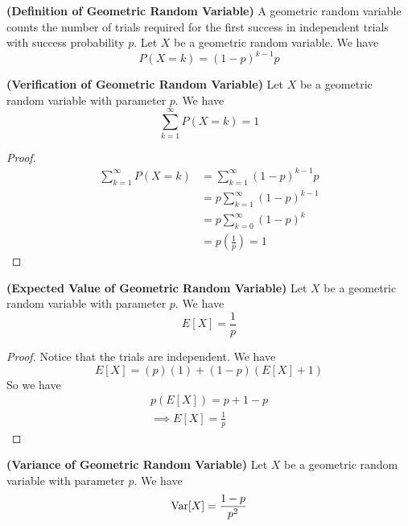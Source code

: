 \documentclass{report}
\begin{document}
\begin{definition}
\textbf{(Definition of Geometric Random Variable)} A geometric random variable counts the number of trials required for the first success in independent trials with success probability $p$. Let  $X$ be a geometric random variable. We have
\begin{equation}
P(X=k)=(1-p)^{k-1}p
\end{equation}
\end{definition}
\begin{theorem}
\textbf{(Verification of Geometric Random Variable)} Let $X$ be a geometric random variable with parameter $p$. We have
\begin{equation}
\sum_{k=1}^\infty P(X=k)=1
\end{equation}
\end{theorem}
\begin{proof}
\begin{align}
\sum_{k=1}^\infty P(X=k)&=\sum_{k=1}^\infty (1-p)^{k-1}p\\
&=p\sum_{k=1}^\infty (1-p)^{k-1}\\
&=p\sum_{k=0}^\infty (1-p)^k\\
&=p(\frac{1}{p})=1
\end{align}
\end{proof}
\begin{theorem}
\textbf{(Expected Value of Geometric Random Variable)} Let $X$ be a geometric random variable with parameter $p$. We have
 \begin{equation}
E[X]=\frac{1}{p}
\end{equation}
\end{theorem}
\begin{proof}
  Notice that the trials are independent. We have
  \begin{equation}
  E[X]=(p)(1)+(1-p)(E[X]+1)
  \end{equation}
  So we have
  \begin{gather}
 p(E[X])=p+1-p\\
 \implies E[X]=\frac{1}{p} 
  \end{gather}
\end{proof}
\begin{theorem}
\textbf{(Variance of Geometric Random Variable)} Let $X$ be a geometric random variable with parameter $p$. We have
\begin{equation}
\text{Var} [X]=\frac{1-p}{p^2}
\end{equation}
\end{theorem}
\end{document}
